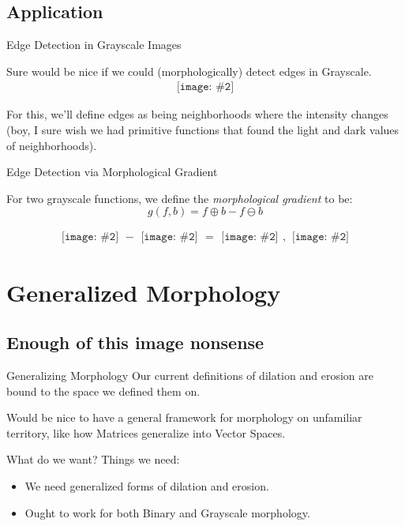 \documentclass{beamer}
\newcommand{\pic}[2]{
     \begin{array}{l}
      \texttt{[image: \#2]}
      \end{array}
}
\newcommand{\dilate}{\oplus}
\newcommand{\erode}{\ominus}
\begin{document}
\subsection{Application}
\begin{frame}{Edge Detection in Grayscale Images}

  Sure would be nice if we could (morphologically) detect
  edges  in Grayscale.
  $$\pic{width=75pt}{images/grayscalecoolhamblen.png}$$
  
  For this, we'll define edges as being neighborhoods where 
  the intensity changes (boy, I sure wish we had primitive functions
  that found the light and dark values of neighborhoods).
\end{frame}

\begin{frame}{Edge Detection via Morphological Gradient}
  \begin{definition}
    For two grayscale functions, we define the 
    \emph{morphological gradient} to be:
    $$g(f,b) = f \dilate b - f \erode b$$
  \end{definition} 
  $$\pic{width=50pt}{images/coolhamblen_graydilated.png}-
    \pic{width=50pt}{images/coolhamblen_grayeroded.png}=
    \pic{width=50pt}{images/coolhamblen_gradiented.png},
    \pic{width=50pt}{images/coolhamblen_gradiented_inverted.png}$$
\end{frame}


\section{Generalized Morphology}
\subsection{Enough of this image nonsense}
\begin{frame}{Generalizing Morphology}
  Our current definitions of dilation and erosion are bound to
  the space we defined them on.

  Would be nice to have a general framework for morphology on
  unfamiliar territory, like how Matrices generalize into Vector Spaces.
  

\end{frame}

\begin{frame}{What do we want?}
  Things we need:
  \begin{itemize}
    \item We need generalized forms of dilation and erosion.
    \item Ought to work for both Binary and Grayscale morphology.
  \end{itemize} 
\end{frame}
\end{document}
